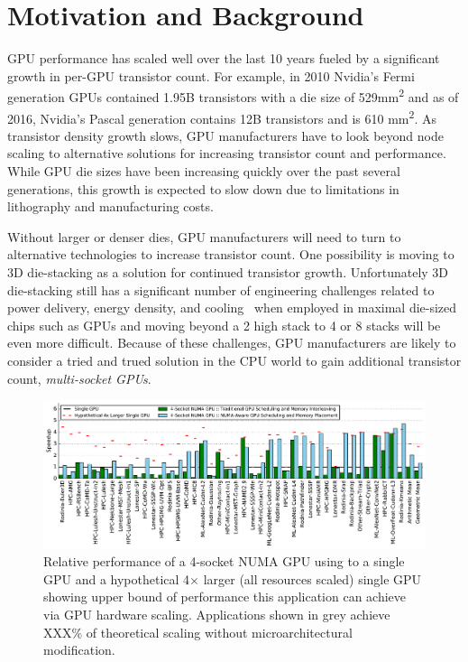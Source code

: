 \section{Motivation and Background}
\label{background}

GPU performance has scaled well over the last 10 years fueled by a significant 
growth in per-GPU transistor count.  For example, in 2010 Nvidia's Fermi 
generation GPUs contained 1.95B transistors with a die size of 
529mm\textsuperscript{2} and as of 2016, Nvidia's Pascal generation contains 
12B transistors and is 610 mm\textsuperscript{2}. As transistor density growth 
slows, GPU manufacturers have to look beyond node scaling to alternative 
solutions for increasing transistor count and performance. While GPU die sizes 
have been increasing quickly over the past several generations, this growth is 
expected to slow down due to limitations in lithography and manufacturing 
costs. 

Without larger or denser dies, GPU manufacturers will need to turn to 
alternative technologies to increase transistor count.  One possibility is 
moving to 3D die-stacking as a solution for continued transistor growth. 
Unfortunately 3D die-stacking still has a significant number of engineering 
challenges related to power delivery, energy density, and 
cooling~\cite{verbree2010cost} when employed in maximal die-sized chips such as 
GPUs and moving beyond a 2 high stack to 4 or 8 stacks will be even more 
difficult. Because of these challenges, GPU manufacturers are likely to 
consider a tried and trued solution in the CPU world to gain additional 
transistor count, 
\textit{multi-socket GPUs}.

\begin{figure}[tp]
    \centering
    \includegraphics[width=1.0\linewidth]{figures/plot_different_baselines.pdf}
    \caption{Relative performance of a 4-socket NUMA GPU using to a single GPU 
and a hypothetical 4$\times$ larger (all resources scaled) single GPU showing 
upper bound of performance this application can achieve via GPU hardware 
scaling. Applications shown in grey achieve XXX\% of theoretical scaling without 
microarchitectural modification.}
    \label{fig:motivation}
\end{figure}

